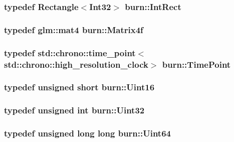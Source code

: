 \hypertarget{namespaceburn_ad4bf628019a74e35d42b2940e961a0a5}{
\subsubsection[{Int\-Rect}]{\setlength{\rightskip}{0pt plus 5cm}typedef {\bf Rectangle}$<${\bf Int32}$>$ {\bf burn\-::\-Int\-Rect}}}\label{namespaceburn_ad4bf628019a74e35d42b2940e961a0a5}
\hypertarget{namespaceburn_a643e9d2ffceb4304e3755a100268a7a3}{
\subsubsection[{Matrix4f}]{\setlength{\rightskip}{0pt plus 5cm}typedef glm\-::mat4 {\bf burn\-::\-Matrix4f}}}\label{namespaceburn_a643e9d2ffceb4304e3755a100268a7a3}
\hypertarget{namespaceburn_a431c4128e194f6d8909971ef6253bca9}{
\subsubsection[{Time\-Point}]{\setlength{\rightskip}{0pt plus 5cm}typedef std\-::chrono\-::time\-\_\-point$<$std\-::chrono\-::high\-\_\-resolution\-\_\-clock$>$ {\bf burn\-::\-Time\-Point}}}\label{namespaceburn_a431c4128e194f6d8909971ef6253bca9}
\hypertarget{namespaceburn_ae0d8cb20051239cfa3dc71407cdef5e4}{
\subsubsection[{Uint16}]{\setlength{\rightskip}{0pt plus 5cm}typedef unsigned short {\bf burn\-::\-Uint16}}}\label{namespaceburn_ae0d8cb20051239cfa3dc71407cdef5e4}
\hypertarget{namespaceburn_ab40b09022209bd449d317c1f0e95356b}{
\subsubsection[{Uint32}]{\setlength{\rightskip}{0pt plus 5cm}typedef unsigned int {\bf burn\-::\-Uint32}}}\label{namespaceburn_ab40b09022209bd449d317c1f0e95356b}
\hypertarget{namespaceburn_a03c9a89b4bb9a4e0962f74ea7afdc557}{
\subsubsection[{Uint64}]{\setlength{\rightskip}{0pt plus 5cm}typedef unsigned long long {\bf burn\-::\-Uint64}}}\label{namespaceburn_a03c9a89b4bb9a4e0962f74ea7afdc557}
